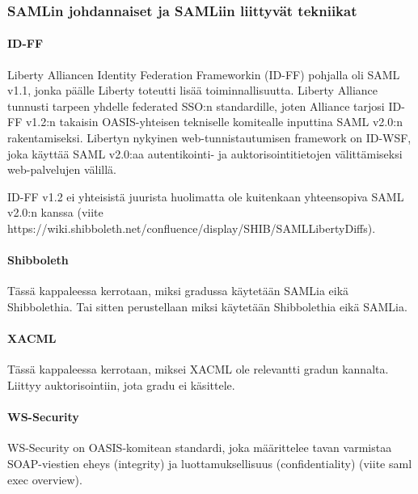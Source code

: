 \documentclass[finnish,gradu]{tktltiki}
\begin{document}
  \subsubsection{SAMLin johdannaiset ja SAMLiin liittyvät tekniikat} %
  \label{ssub:samlin_johdannaiset}


  \paragraph{ID-FF} %
  \label{par:id_ff}
  Liberty Alliancen Identity Federation Frameworkin (ID-FF) pohjalla oli SAML v1.1, jonka päälle Liberty toteutti lisää toiminnallisuutta.
  Liberty Alliance tunnusti tarpeen yhdelle federated SSO:n standardille, joten Alliance tarjosi ID-FF v1.2:n takaisin OASIS-yhteisen tekniselle komitealle inputtina SAML v2.0:n rakentamiseksi.
  Libertyn nykyinen web-tunnistautumisen framework on ID-WSF, joka käyttää SAML v2.0:aa autentikointi- ja auktorisointitietojen välittämiseksi web-palvelujen välillä.

  ID-FF v1.2 ei yhteisistä juurista huolimatta ole kuitenkaan yhteensopiva SAML v2.0:n kanssa (viite https://wiki.shibboleth.net/confluence/display/SHIB/SAMLLibertyDiffs).


  \paragraph{Shibboleth} %
  \label{par:saml_vs_shibboleth}
  Tässä kappaleessa kerrotaan, miksi gradussa käytetään SAMLia eikä Shibbolethia. Tai sitten perustellaan miksi käytetään Shibbolethia eikä SAMLia.


  \paragraph{XACML} %
  \label{par:xacml}
  Tässä kappaleessa kerrotaan, miksei XACML ole relevantti gradun kannalta. Liittyy auktorisointiin, jota gradu ei käsittele.


  \paragraph{WS-Security} %
  \label{par:ws_security}
  WS-Security on OASIS-komitean standardi, joka määrittelee tavan varmistaa SOAP-viestien eheys (integrity) ja luottamuksellisuus (confidentiality) (viite saml exec overview).
\end{document}
